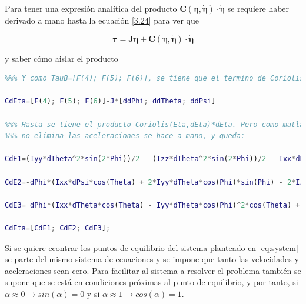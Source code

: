 \documentclass[twoside,11pt]{book}
\begin{document}
Para tener una expresión analítica del producto $\pmb{C(\eta,\dot{\eta})\cdot \dot{\eta}}$ se requiere haber derivado a mano hasta la ecuación \ref{3.24} para ver que 

\begin{equation}
\pmb{\tau}=\pmb{J}\ddot{\pmb{\eta}} + \pmb{C(\eta,\dot{\eta})\cdot \dot{\eta}}
\end{equation}

y saber cómo aislar el producto
\singlespacing
\begin{lstlisting}[language=Matlab,firstnumber=57]
%%% Derivando a mano se obtiene que TauB=J*ddEta+CdEta 
%%% Y como TauB=[F(4); F(5); F(6)], se tiene que el termino de Coriolis es:

CdEta=[F(4); F(5); F(6)]-J*[ddPhi; ddTheta; ddPsi]

%%% Hasta se tiene el producto Coriolis(Eta,dEta)*dEta. Pero como matlab
%%% no elimina las aceleraciones se hace a mano, y queda:

CdE1=(Iyy*dTheta^2*sin(2*Phi))/2 - (Izz*dTheta^2*sin(2*Phi))/2 - Ixx*dPsi*dTheta*cos(Theta) - (Iyy*dPsi^2*sin(2*Phi)*cos(Theta)^2)/2 + (Izz*dPsi^2*sin(2*Phi)*cos(Theta)^2)/2 - Iyy*dPsi*dTheta*cos(2*Phi)*cos(Theta) + Izz*dPsi*dTheta*cos(2*Phi)*cos(Theta);

CdE2=-dPhi*(Ixx*dPsi*cos(Theta) + 2*Iyy*dTheta*cos(Phi)*sin(Phi) - 2*Izz*dTheta*cos(Phi)*sin(Phi) + Iyy*dPsi*cos(Phi)^2*cos(Theta) - Izz*dPsi*cos(Phi)^2*cos(Theta) - Iyy*dPsi*cos(Theta)*sin(Phi)^2 + Izz*dPsi*cos(Theta)*sin(Phi)^2) - Ixx*dPsi^2*cos(Theta)*sin(Theta) + Iyy*dPsi^2*cos(Theta)*sin(Phi)^2*sin(Theta)+ Izz*dPsi^2*cos(Phi)^2*cos(Theta)*sin(Theta);

CdE3= dPhi*(Ixx*dTheta*cos(Theta) - Iyy*dTheta*cos(Phi)^2*cos(Theta) + Izz*dTheta*cos(Phi)^2*cos(Theta) + Iyy*dTheta*cos(Theta)*sin(Phi)^2 - Izz*dTheta*cos(Theta)*sin(Phi)^2 + 2*Iyy*dPsi*cos(Phi)*cos(Theta)^2*sin(Phi) - 2*Izz*dPsi*cos(Phi)*cos(Theta)^2*sin(Phi)) + Iyy*dTheta^2*cos(Phi)*sin(Phi)*sin(Theta) - Izz*dTheta^2*cos(Phi)*sin(Phi)*sin(Theta) + 2*Ixx*dPsi*dTheta*cos(Theta)*sin(Theta) - 2*Izz*dPsi*dTheta*cos(Phi)^2*cos(Theta)*sin(Theta) - 2*Iyy*dPsi*dTheta*cos(Theta)*sin(Phi)^2*sin(Theta);

CdEta=[CdE1; CdE2; CdE3];
\end{lstlisting}
\onehalfspacing
Si se quiere econtrar los puntos de equilibrio del sistema planteado en \ref{eq:system} se parte del mismo sistema de ecuaciones y se impone que tanto las velocidades y aceleraciones sean cero. 
Para facilitar al sistema a resolver el problema también se supone que se está en condiciones próximas al punto de equilibrio, y por tanto, si  $\alpha \approx 0 \rightarrow sin(\alpha)=0$ y si $\alpha \approx 1 \rightarrow cos(\alpha)=1$.
\end{document}
